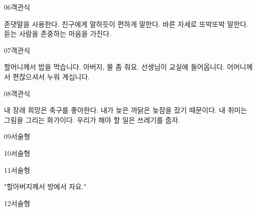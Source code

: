 \documentclass[fs12,seriesSau]{korfarm-base}
\begin{document}
\begin{kfQBlock}{06}{객관식}
\begin{kfChoices}
\kfChoice 존댓말을 사용한다.
\kfChoice 친구에게 말하듯이 편하게 말한다.
\kfChoice 바른 자세로 또박또박 말한다.
\kfChoice 듣는 사람을 존중하는 마음을 가진다.
\end{kfChoices}
\end{kfQBlock}

\begin{kfQBlock}{07}{객관식}
\begin{kfChoices}
\kfChoice 할머니께서 밥을 먹습니다.
\kfChoice 아버지, 물 좀 줘요.
\kfChoice 선생님이 교실에 들어옵니다.
\kfChoice 어머니께서 편찮으셔서 누워 계십니다.
\end{kfChoices}
\end{kfQBlock}

\begin{kfQBlock}{08}{객관식}
\begin{kfChoices}
\kfChoice 내 장래 희망은 축구를 좋아한다.
\kfChoice 내가 늦은 까닭은 늦잠을 잤기 때문이다.
\kfChoice 내 취미는 그림을 그리는 화가이다.
\kfChoice 우리가 해야 할 일은 쓰레기를 줍자.
\end{kfChoices}
\end{kfQBlock}

\begin{kfQBlock}{09}{서술형}
\end{kfQBlock}

\begin{kfQBlock}{10}{서술형}
\end{kfQBlock}

\begin{kfQBlock}{11}{서술형}
\begin{kfEvidence}"할아버지께서 방에서 자요."\end{kfEvidence}
\end{kfQBlock}

\begin{kfQBlock}{12}{서술형}
\end{kfQBlock}
\end{document}
